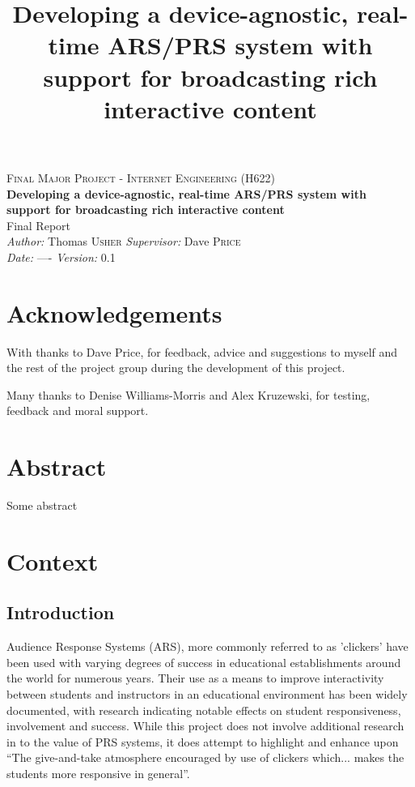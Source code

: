 \documentclass[a4papert,11pt,notitlepage]{ltxdoc}
\title{Developing a device-agnostic, real-time ARS/PRS system with support for
broadcasting rich interactive content}
\begin{document}
\vspace*{\fill}
\begin{center}
\textsc{\Large Final Major Project - Internet Engineering (H622)}\\[0.3cm]
{\Large \bfseries Developing a device-agnostic, real-time ARS/PRS system with support for
broadcasting rich interactive content}\\[0.3cm]
{\Large Final Report}\\[0.3cm]
\emph{Author:} Thomas \textsc{Usher} \hspace{1cm} \emph{Supervisor:} Dave \textsc{Price}\\
\emph{Date:} ---- \hspace{1cm} \emph{Version:} 0.1
\end{center}
\vspace*{\fill}
\pagebreak

\section{Acknowledgements}
With thanks to Dave Price, for feedback, advice and suggestions to myself and the rest of the project group during the development of this project.

Many thanks to Denise Williams-Morris and Alex Kruzewski, for testing, feedback and moral support.
\pagebreak

\section{Abstract}
Some abstract 

\tableofcontents

\section{Context}
\subsection{Introduction}
Audience Response Systems (ARS), more commonly referred to as 'clickers' have been used with varying degrees of success in educational establishments around the world for numerous years. Their use as a means to improve interactivity between students and instructors in an educational environment has been widely documented, with research indicating notable effects on student responsiveness, involvement and success. While this project does not involve additional research in to the value of PRS systems, it does attempt to highlight and enhance upon ``The give-and-take atmosphere encouraged by use of clickers which... makes the students more responsive in general''\cite{wood:clickers}.
\end{document}
